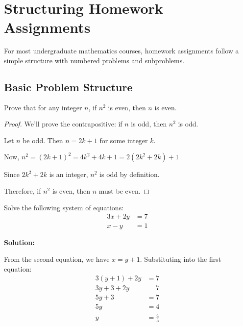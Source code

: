 \documentclass[11pt,a4paper]{article}
\begin{document}
\section{Structuring Homework Assignments}

For most undergraduate mathematics courses, homework assignments follow a simple structure with numbered problems and subproblems.

\subsection{Basic Problem Structure}

\begin{tcolorbox}[title=Problem 1]
    Prove that for any integer $n$, if $n^2$ is even, then $n$ is even.
\end{tcolorbox}

\begin{proof}
    We'll prove the contrapositive: if $n$ is odd, then $n^2$ is odd.
    
    Let $n$ be odd. Then $n = 2k + 1$ for some integer $k$.
    
    Now, $n^2 = (2k + 1)^2 = 4k^2 + 4k + 1 = 2(2k^2 + 2k) + 1$
    
    Since $2k^2 + 2k$ is an integer, $n^2$ is odd by definition.
    
    Therefore, if $n^2$ is even, then $n$ must be even.
\end{proof}

\begin{tcolorbox}[title=Problem 2]
    Solve the following system of equations:
    \begin{align}
        3x + 2y &= 7 \\
        x - y &= 1
    \end{align}
\end{tcolorbox}

\textbf{Solution:}

From the second equation, we have $x = y + 1$. Substituting into the first equation:
\begin{align}
    3(y + 1) + 2y &= 7 \\
    3y + 3 + 2y &= 7 \\
    5y + 3 &= 7 \\
    5y &= 4 \\
    y &= \frac{4}{5}
\end{align}
\end{document}
